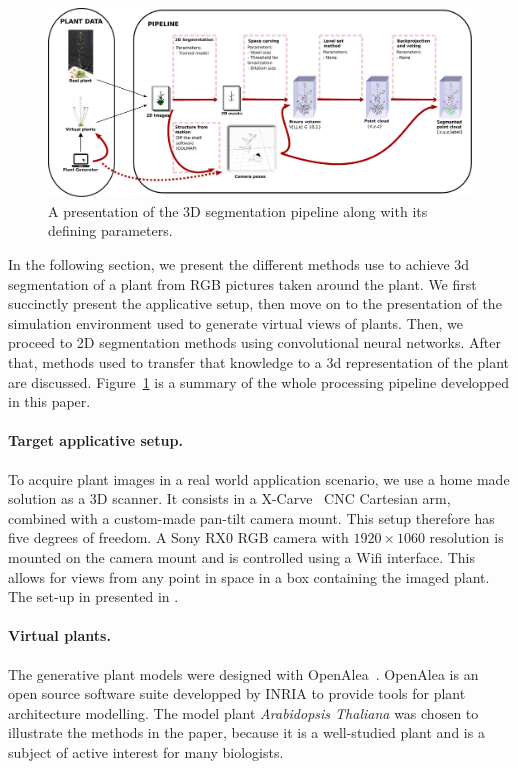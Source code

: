 \begin{figure}[h!]
    \centering \includegraphics[width = \linewidth]{figures/pipeline.pdf}
    \caption{A presentation of the 3D segmentation pipeline along with its
defining parameters.} \label{fig:pipe}
\end{figure}
In the following section, we present the different methods use to achieve 3d
segmentation of a plant from RGB pictures taken around the plant. We first
succinctly present the applicative setup, then move on to the presentation of
the simulation environment used to generate virtual views of plants. Then, we
proceed to 2D segmentation methods using convolutional neural networks. After
that, methods used to transfer that knowledge to a 3d representation of the
plant are discussed. Figure~\ref{fig:pipe} is a summary of the whole processing
pipeline developped in this paper.

\paragraph{Target applicative setup.}
To acquire plant images in a real world application scenario, we use a home made solution as a 3D
scanner. It consists in a X-Carve~\cite{xcarve} CNC Cartesian arm, combined with a
custom-made pan-tilt camera mount. This setup therefore has five degrees of freedom.
A Sony RX0 RGB camera with $1920 \times 1060$ resolution is mounted on the camera mount and is controlled using a Wifi interface. This allows for views from any point in space in a box containing
the imaged plant. The set-up in presented in \cite{wintz2018automated}.

\paragraph{Virtual plants.}

The generative plant models were designed with
OpenAlea~\cite{pradal2009plantgl}. OpenAlea is an open source software
suite developped by INRIA to provide tools for plant architecture
modelling. The model plant \emph{Arabidopsis Thaliana} was chosen to
illustrate the methods in the paper, because it is a well-studied
plant and is a subject of active interest for many biologists.

